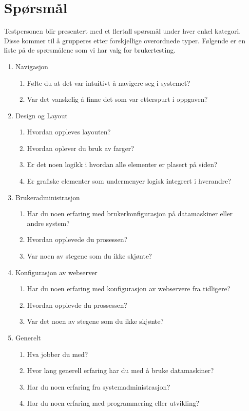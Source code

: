 \section{Spørsmål}
Testpersonen blir presentert med et flertall spørsmål under hver enkel kategori. Disse kommer til å grupperes etter forskjellige overordnede typer. Følgende er en liste på de spørsmålene som vi har valg for brukertesting.

\begin{enumerate}
\setlength{\itemsep}{1pt}
\setlength{\parskip}{0pt}
\setlength{\parsep}{0pt}
\item Navigasjon
\begin{enumerate}
\item Følte du at det var intuitivt å navigere seg i systemet?
\item Var det vanskelig å finne det som var etterspurt i oppgaven?
\end{enumerate}
\item Design og Layout
\begin{enumerate}
\item Hvordan oppleves layouten?
\item Hvordan oplever du bruk av farger?
\item Er det noen logikk i hvordan alle elementer er plasert på siden?
\item Er grafiske elementer som undermenyer logisk integrert i hverandre?
\end{enumerate}
\item Brukeradministrasjon
\begin{enumerate}
\item Har du noen erfaring med brukerkonfigurasjon på datamaskiner eller andre system?
\item Hvordan opplevede du prosessen?
\item Var noen av stegene som du ikke skjønte?
\end{enumerate}
\item Konfigurasjon av webserver
\begin{enumerate}
\item Har du noen erfaring med konfigurasjon av webservere fra tidligere?
\item Hvordan opplevde du prossessen?
\item Var det noen av stegene som du ikke skjønte?
\end{enumerate}
\item Generelt
\begin{enumerate}
\item Hva jobber du med?
\item Hvor lang generell erfaring har du med å bruke datamaskiner?
\item Har du noen erfaring fra systemadministrasjon?
\item Har du noen erfaring med programmering eller utvikling?
\end{enumerate}
\end{enumerate}

